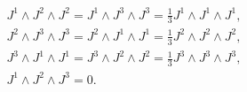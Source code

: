 \begin{equation}
\begin{gathered}
   J^1\wedge J^2\wedge J^2 
      = J^1\wedge J^3\wedge J^3
      = \tfrac{1}{3}J^1\wedge J^1\wedge J^1 , \\
   J^2\wedge J^3\wedge J^3
      = J^2\wedge J^1\wedge J^1
      = \tfrac{1}{3}J^2\wedge J^2\wedge J^2 , \\
   J^3\wedge J^1\wedge J^1
      = J^3\wedge J^2\wedge J^2
      = \tfrac{1}{3}J^3\wedge J^3\wedge J^3 , \\
   J^1\wedge J^2\wedge J^3 =0 .
\end{gathered}
\end{equation}

